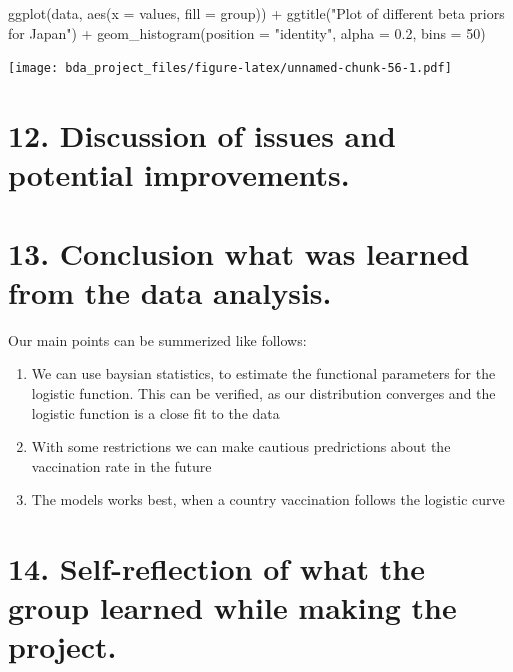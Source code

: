 \documentclass[
]{article}
\newenvironment{Shaded}{\begin{snugshade}}{\end{snugshade}}
\newcommand{\AttributeTok}[1]{\textcolor[rgb]{0.77,0.63,0.00}{#1}}
\newcommand{\DecValTok}[1]{\textcolor[rgb]{0.00,0.00,0.81}{#1}}
\newcommand{\FloatTok}[1]{\textcolor[rgb]{0.00,0.00,0.81}{#1}}
\newcommand{\FunctionTok}[1]{\textcolor[rgb]{0.00,0.00,0.00}{#1}}
\newcommand{\NormalTok}[1]{#1}
\newcommand{\SpecialCharTok}[1]{\textcolor[rgb]{0.00,0.00,0.00}{#1}}
\newcommand{\StringTok}[1]{\textcolor[rgb]{0.31,0.60,0.02}{#1}}
\begin{document}
\begin{Shaded}
\begin{Highlighting}[]
\FunctionTok{ggplot}\NormalTok{(data, }\FunctionTok{aes}\NormalTok{(}\AttributeTok{x =}\NormalTok{ values, }\AttributeTok{fill =}\NormalTok{ group)) }\SpecialCharTok{+} \FunctionTok{ggtitle}\NormalTok{(}\StringTok{"Plot of different beta priors for Japan"}\NormalTok{) }\SpecialCharTok{+}
  \FunctionTok{geom\_histogram}\NormalTok{(}\AttributeTok{position =} \StringTok{"identity"}\NormalTok{, }\AttributeTok{alpha =} \FloatTok{0.2}\NormalTok{, }\AttributeTok{bins =} \DecValTok{50}\NormalTok{)}
\end{Highlighting}
\end{Shaded}

\texttt{[image: bda\_project\_files/figure-latex/unnamed-chunk-56-1.pdf]}

\hypertarget{discussion-of-issues-and-potential-improvements.}{%
\section{12. Discussion of issues and potential
improvements.}\label{discussion-of-issues-and-potential-improvements.}}

\hypertarget{conclusion-what-was-learned-from-the-data-analysis.}{%
\section{13. Conclusion what was learned from the data
analysis.}\label{conclusion-what-was-learned-from-the-data-analysis.}}

Our main points can be summerized like follows:

\begin{enumerate}
\def\labelenumi{\arabic{enumi}.}
\item
  We can use baysian statistics, to estimate the functional parameters
  for the logistic function. This can be verified, as our distribution
  converges and the logistic function is a close fit to the data
\item
  With some restrictions we can make cautious predrictions about the
  vaccination rate in the future
\item
  The models works best, when a country vaccination follows the logistic
  curve
\end{enumerate}

\hypertarget{self-reflection-of-what-the-group-learned-while-making-the-project.}{%
\section{14. Self-reflection of what the group learned while making the
project.}\label{self-reflection-of-what-the-group-learned-while-making-the-project.}}
\end{document}
